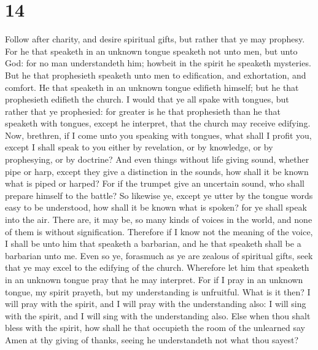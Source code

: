 \hypertarget{section-13}{%
\section{14}\label{section-13}}

 Follow after charity, and desire spiritual gifts, but
rather that ye may prophesy.  For he that speaketh in an
unknown tongue speaketh not unto men, but unto God: for no man
understandeth him; howbeit in the spirit he speaketh mysteries.
 But he that prophesieth speaketh unto men to edification,
and exhortation, and comfort.  He that speaketh in an
unknown tongue edifieth himself; but he that prophesieth edifieth the
church.  I would that ye all spake with tongues, but
rather that ye prophesied: for greater is he that prophesieth than he
that speaketh with tongues, except he interpret, that the church may
receive edifying.  Now, brethren, if I come unto you
speaking with tongues, what shall I profit you, except I shall speak to
you either by revelation, or by knowledge, or by prophesying, or by
doctrine?  And even things without life giving sound,
whether pipe or harp, except they give a distinction in the sounds, how
shall it be known what is piped or harped?  For if the
trumpet give an uncertain sound, who shall prepare himself to the
battle?  So likewise ye, except ye utter by the tongue
words easy to be understood, how shall it be known what is spoken? for
ye shall speak into the air.  There are, it may be, so
many kinds of voices in the world, and none of them is without
signification.  Therefore if I know not the meaning of
the voice, I shall be unto him that speaketh a barbarian, and he that
speaketh shall be a barbarian unto me.  Even so ye,
forasmuch as ye are zealous of spiritual gifts, seek that ye may excel
to the edifying of the church.  Wherefore let him that
speaketh in an unknown tongue pray that he may interpret.
 For if I pray in an unknown tongue, my spirit prayeth,
but my understanding is unfruitful.  What is it then? I
will pray with the spirit, and I will pray with the understanding also:
I will sing with the spirit, and I will sing with the understanding
also.  Else when thou shalt bless with the spirit, how
shall he that occupieth the room of the unlearned say Amen at thy giving
of thanks, seeing he understandeth not what thou sayest? 
